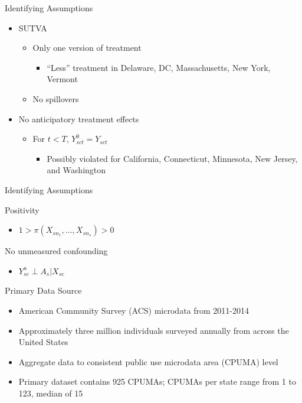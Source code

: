 \documentclass[hyperref={pdfpagelabels=false}]{beamer}
\begin{document}
\begin{frame}{Identifying Assumptions}

\begin{itemize}
    \item SUTVA \bigskip
    \begin{itemize}
        \item Only one version of treatment \bigskip
        \begin{itemize}
            \item ``Less'' treatment in Delaware, DC, Massachusetts, New York, Vermont \bigskip
        \end{itemize}
        \item No spillovers \bigskip
    \end{itemize}
    \item No anticipatory treatment effects \bigskip
    \begin{itemize}
        \item For $t < T$, $Y_{sct}^0 = Y_{sct}$ \bigskip
        \begin{itemize}
            \item Possibly violated for California, Connecticut, Minnesota, New Jersey, and Washington
        \end{itemize}
    \end{itemize}
\end{itemize}

\end{frame}

\begin{frame}{Identifying Assumptions}
    \item Positivity \bigskip
    \begin{itemize}
        \item $1 > \pi(X_{sn_1}, ..., X_{sn_s}) > 0$ \bigskip
    \end{itemize}
    \item No unmeasured confounding \bigskip
    \begin{itemize}
        \item $Y^a_{sc} \perp A_s | X_{sc}$ \bigskip 
    \end{itemize}
\end{frame}

\begin{frame}{Primary Data Source}
    \begin{itemize}
    \item American Community Survey (ACS) microdata from 2011-2014 \bigskip 
    \item Approximately three million individuals surveyed annually from across the United States \bigskip 
    \item Aggregate data to consistent public use microdata area (CPUMA) level \bigskip
    \item Primary dataset contains 925 CPUMAs; CPUMAs per state range from 1 to 123, median of 15
    \end{itemize}
\end{frame}   
\end{document}
